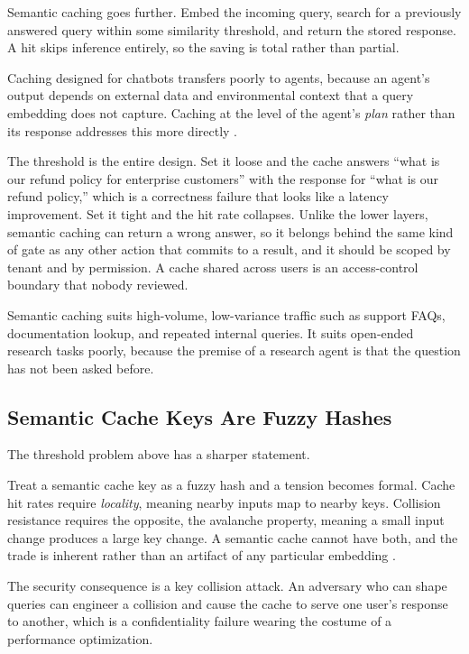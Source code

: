 Semantic caching goes further. Embed the incoming query, search for a previously answered query within some similarity threshold, and return the stored response.
A hit skips inference entirely, so the saving is total rather than partial.

Caching designed for chatbots transfers poorly to agents, because an agent's output depends on external data and environmental context that a query embedding does not capture. Caching at the level of the agent's \emph{plan} rather than its response addresses this more directly \cite{plancache2025}.

The threshold is the entire design. Set it loose and the cache answers ``what is
our refund policy for enterprise customers'' with the response for ``what is our
refund policy,'' which is a correctness failure that looks like a latency
improvement. Set it tight and the hit rate collapses. Unlike the lower layers,
semantic caching can return a wrong answer, so it belongs behind the same kind of
gate as any other action that commits to a result, and it should be scoped by
tenant and by permission. A cache shared across users is an access-control
boundary that nobody reviewed.

Semantic caching suits high-volume, low-variance traffic such as support FAQs, documentation lookup, and repeated internal queries. It suits open-ended research
tasks poorly, because the premise of a research agent is that the question has
not been asked before.

\subsection{Semantic Cache Keys Are Fuzzy Hashes}

The threshold problem above has a sharper statement.

Treat a semantic cache key as a fuzzy hash and a tension becomes formal. Cache
hit rates require \emph{locality}, meaning nearby inputs map to nearby keys.
Collision resistance requires the opposite, the avalanche property, meaning a
small input change produces a large key change. A semantic cache cannot have
both, and the trade is inherent rather than an artifact of any particular
embedding \cite{cachecollision2026}.

The security consequence is a key collision attack. An adversary who can shape
queries can engineer a collision and cause the cache to serve one user's
response to another, which is a confidentiality failure wearing the costume of a
performance optimization.

